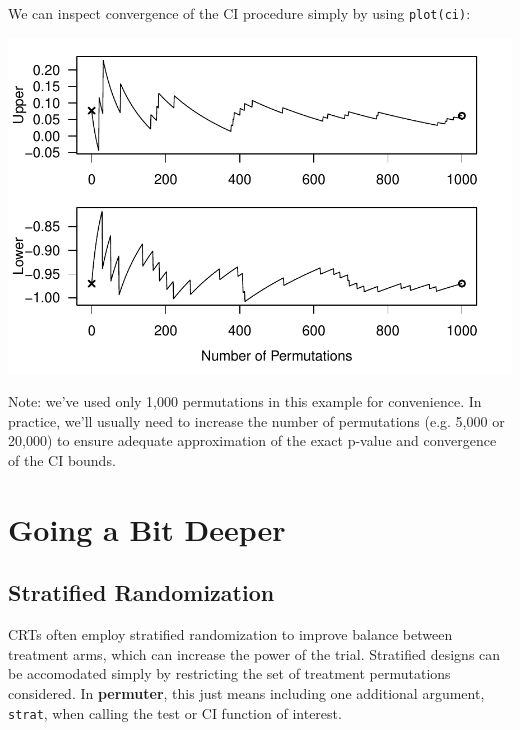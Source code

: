 \documentclass[12pt]{article}\usepackage[]{graphicx}\usepackage[]{color}
\makeatletter
\def\maxwidth{ %
  \ifdim\Gin@nat@width>\linewidth
    \linewidth
  \else
    \Gin@nat@width
  \fi
}
\newenvironment{knitrout}{}{} %
\makeatother
\begin{document}
We can inspect convergence of the CI procedure simply by using \texttt{plot(ci)}:
\begin{knitrout}
\color{fgcolor}

{\centering \includegraphics[width=\maxwidth]{figure/plot-1} 

}



\end{knitrout}
Note: we've used only 1,000 permutations in this example for convenience. In practice, we'll usually need to increase the number of permutations (e.g. 5,000 or 20,000) to ensure adequate approximation of the exact p-value and convergence of the CI bounds.

\section{Going a Bit Deeper}

\subsection{Stratified Randomization}
CRTs often employ stratified randomization to improve balance between treatment arms, which can increase the power of the trial. Stratified designs can be accomodated simply by restricting the set of treatment permutations considered. In \textbf{permuter}, this just means including one additional argument, \texttt{strat}, when calling the test or CI function of interest.
\end{document}
